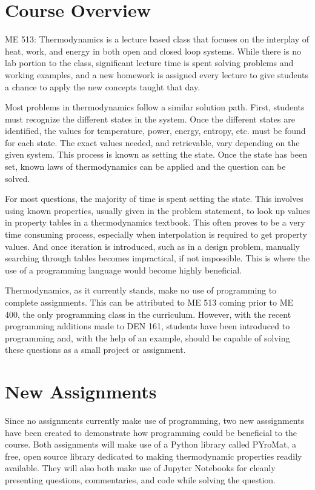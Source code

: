 \section{Course Overview}

ME 513: Thermodynamics is a lecture based class that focuses on the interplay of heat, work, and energy in both
open and closed loop systems. While there is no lab portion to the class, significant lecture time is spent
solving problems and working examples, and a new homework is assigned every lecture to give students a chance
to apply the new concepts taught that day.

Most problems in thermodynamics follow a similar solution path. First, students must recognize the different
states in the system. Once the different states are identified, the values for temperature, power, energy,
entropy, etc. must be found for each state. The exact values needed, and retrievable, vary depending on the
given system. This process is known as setting the state. Once the state has been set, known laws of
thermodynamics can be applied and the question can be solved.

For most questions, the majority of time is spent setting the state. This involves using known properties, 
usually given in the problem statement, to look up values in property tables in a thermodynamics textbook. 
This often proves to be a very time consuming process, especially when interpolation is required to get 
property values. And once iteration is introduced, such as in a design problem, manually searching through
tables becomes impractical, if not impossible. This is where the use of a programming language would become 
highly beneficial.

Thermodynamics, as it currently stands, make no use of programming to complete assignments.
This can be attributed to ME 513 coming prior to ME 400, the only programming class in the 
curriculum. However, with the recent programming additions made to DEN 161, students have been introduced
to programming and, with the help of an example, should be capable of solving these questions as a small
project or assignment.

\section{New Assignments}

Since no assignments currently make use of programming, two new asssignments have been created to demonstrate
how programming could be beneficial to the course. Both assignments will make use of a Python library called
PYroMat, a free, open source library dedicated to making thermodynamic properties readily available.
They will also both make use of Jupyter Notebooks for cleanly presenting questions, commentaries, and code
while solving the question.

